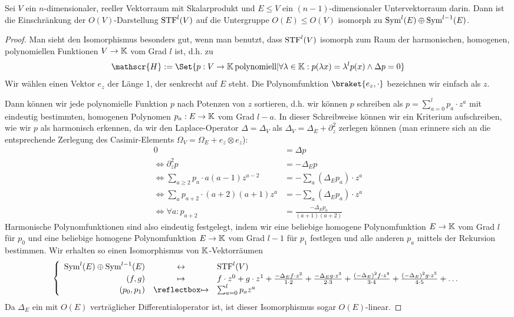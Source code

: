
\begin{lemma}\label{darstellungen:o3:restriktion_harmonische_polynome}
Sei $V$ ein $n$-dimensionaler, reeller Vektorraum mit Skalarprodukt und $E\leq V$ ein $(n-1)$-dimensionaler Untervektorraum darin. Dann ist die Einschränkung der $O(V)$-Darstellung $\operatorname{STF}^l(V)$ auf die Untergruppe $O(E) \leq O(V)$ isomorph zu $\operatorname{Sym}^l(E) \oplus \operatorname{Sym}^{l-1}(E)$.
\end{lemma}
\begin{proof}
Man sieht den Isomorphismus besonders gut, wenn man benutzt, dass $\operatorname{STF}^l(V)$ isomorph zum Raum der harmonischen, homogenen, polynomiellen Funktionen $V\to\mathbb{K}$ vom Grad $l$ ist, d.h. zu
\[\mathscr{H} := \Set{p: V\to\IK \,\text{polynomiell} | \forall\lambda\in\IK: p(\lambda x) = \lambda^l p(x) \wedge \Delta p = 0}\]
Wir wählen einen Vektor $e_z$ der Länge 1, der senkrecht auf $E$ steht. Die Polynomfunktion $\braket{e_z,\cdot}$ bezeichnen wir einfach als $z$.

Dann können wir jede polynomielle Funktion $p$ nach Potenzen von $z$ sortieren, d.h. wir können $p$ schreiben als $p = \sum_{a=0}^l p_a \cdot z^a$ mit eindeutig bestimmten, homogenen Polynomen $p_a: E\to\mathbb{K}$ vom Grad $l-a$. In dieser Schreibweise können wir ein Kriterium aufschreiben, wie wir $p$ als harmonisch erkennen, da wir den Laplace-Operator $\Delta=\Delta_V$ als $\Delta_V = \Delta_E + \partial_z^2$ zerlegen können (man erinnere sich an die entsprechende Zerlegung des Casimir-Elements $\Omega_V=\Omega_E + e_z\otimes e_z$):
\begin{align*}
0 &= \Delta p \\
\iff \partial_z^2 p &= -\Delta_ E p \\
\iff \sum_{a\geq 2} p_a \cdot a(a-1)z^{a-2} &= -\sum_a (\Delta_E p_a)\cdot z^a \\
\iff \sum_a p_{a+2}\cdot (a+2)(a+1)z^a &= -\sum_a (\Delta_E p_a)\cdot z^a \\
\iff \forall a: p_{a+2} &= \frac{-\Delta_E p_a}{(a+1)(a+2)}
\end{align*}
Harmonische Polynomfunktionen sind also eindeutig festgelegt, indem wir eine beliebige homogene Polynomfunktion $E\to\mathbb{K}$ vom Grad $l$ für $p_0$ und eine beliebige homogene Polynomfunktion $E\to\mathbb{K}$ vom Grad $l-1$ für $p_1$ festlegen und alle anderen $p_a$ mittels der Rekursion bestimmen. Wir erhalten so einen Isomorphismus von $\mathbb{K}$-Vektorräumen
\[\left\lbrace\begin{array}{rcl}
\Sym^l(E) \oplus \Sym^{l-1}(E) &\leftrightarrow& \STF^l(V) \\
(f,g) &\mapsto& f\cdot z^0 + g\cdot z^1 + \frac{-\Delta_E f\cdot z^2}{1\cdot 2} + \frac{-\Delta_E g\cdot z^3}{2\cdot 3} + \frac{(-\Delta_E)^2 f \cdot z^4}{3\cdot 4} + \frac{(-\Delta_E)^2 g \cdot z^5}{4\cdot 5 } + \ldots \\
(p_0,p_1) &\mapsfrom& \sum_{a=0}^l p_a z^a
\end{array}\right.\]
Da $\Delta_E$ ein mit $O(E)$ verträglicher Differentialoperator ist, ist dieser Isomorphismus sogar $O(E)$-linear.
\end{proof}

